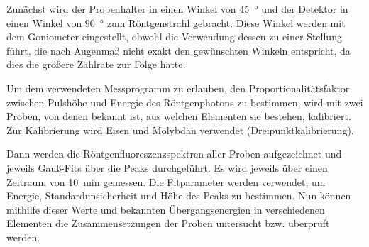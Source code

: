 \documentclass[
	a4paper,
	12pt,
	pagesize,
	ngerman
]{scrartcl}
\begin{document}
	Zunächst wird der Probenhalter in einen Winkel von \SI{45}{\degree} und der Detektor in einen Winkel von \SI{90}{\degree} zum Röntgenstrahl gebracht.
	Diese Winkel werden mit dem Goniometer eingestellt, obwohl die Verwendung dessen zu einer Stellung führt, die nach Augenmaß nicht exakt den gewünschten Winkeln entspricht, da dies die größere Zählrate zur Folge hatte.

	Um dem verwendeten Messprogramm zu erlauben, den Proportionalitätsfaktor zwischen Pulshöhe und Energie des Röntgenphotons zu bestimmen, wird mit zwei Proben, von denen bekannt ist, aus welchen Elementen sie bestehen, kalibriert.
	Zur Kalibrierung wird Eisen und Molybdän verwendet (Dreipunktkalibrierung).

	Dann werden die Röntgenfluoreszenzspektren aller Proben aufgezeichnet und jeweils Gauß-Fits über die Peaks durchgeführt.
	Es wird jeweils über einen Zeitraum von \SI{10}{\minute} gemessen.
	Die Fitparameter werden verwendet, um Energie, Standardunsicherheit und Höhe des Peaks zu bestimmen.
	Nun können mithilfe dieser Werte und bekannten Übergangsenergien in verschiedenen Elementen die Zusammensetzungen der Proben untersucht bzw. überprüft werden.
\end{document}

